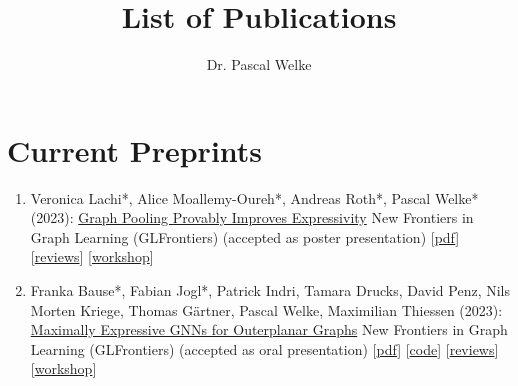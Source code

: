 \documentclass{scrartcl}
\author{Dr. Pascal Welke}
\title{List of Publications}
\begin{document}
\setcounter{saveenumi}{0}
\newcommand{\seti}{\setcounter{saveenumi}{\value{enumi}}}
\newcommand{\conti}{\setcounter{enumi}{\value{saveenumi}}}


\section{Current Preprints}
\begin{enumerate}
\conti
\item
\label{lmrw2023graphpooling}
Veronica Lachi*, Alice Moallemy-Oureh*, Andreas Roth*, Pascal Welke* (2023):\newline
\href{https://openreview.net/pdf?id=lR5NYB9zrv}{Graph Pooling Provably Improves Expressivity}\newline
New Frontiers in Graph Learning (GLFrontiers)\newline
(accepted as poster presentation)\newline
{\footnotesize
[\href{https://openreview.net/pdf?id=lR5NYB9zrv}{pdf}]
[\href{https://openreview.net/forum?id=lR5NYB9zrv}{reviews}]
[\href{https://glfrontiers.github.io/}{workshop}]
}
\item
\label{bausejogl2023outerplanarglfrontiers}
Franka Bause*, Fabian Jogl*, Patrick Indri, Tamara Drucks, David Penz, Nils Morten Kriege, Thomas Gärtner, Pascal Welke, Maximilian Thiessen (2023):\newline
\href{https://openreview.net/pdf?id=dn87xnULwF}{Maximally Expressive GNNs for Outerplanar Graphs}\newline
New Frontiers in Graph Learning (GLFrontiers)\newline
(accepted as oral presentation)\newline
{\footnotesize
[\href{https://openreview.net/pdf?id=dn87xnULwF}{pdf}]
[\href{https://github.com/ocatias/outerplanarGNNs/}{code}]
[\href{https://openreview.net/forum?id=gXCqzpvhuD}{reviews}]
[\href{https://glfrontiers.github.io/}{workshop}]
}
\seti
\end{enumerate}
\end{document}
